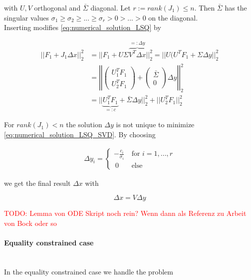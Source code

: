 \documentclass{scrartcl}[12pt, halfparskip]
\newcommand{\todo}[1]{\textcolor{red}{TODO: #1}}
\begin{document}
\begin{itemize}
	with $U, V$ orthogonal and $\bar{\Sigma}$ diagonal. Let $r := rank(J_1) \le n$. Then $\bar{\Sigma}$ has the singular values $\sigma_1 \ge \sigma_2 \ge ... \ge \sigma_r > 0 > ... > 0$ on the diagonal. \\
	Inserting modifies \eqref{eq:numerical_solution_LSQ} by
	
	\begin{align}
		|| F_1 + J_1 \Delta x ||_2^2 & = || F_1 + U \Sigma \overbrace{V^T \Delta x}^{=: \Delta y} ||_2^2 = || U ( U^T F_1 + \Sigma \Delta y ||_2^2 \label{eq:numerical_solution_LSQ_SVD} \\
		& = \left| \left| \begin{pmatrix}
		U_1^T F_1 \\
		U_2^T F_1
		\end{pmatrix} + 
		\begin{pmatrix}
		\bar{\Sigma} \\
		0
		\end{pmatrix}
		\Delta y \right| \right|_2^2 \nonumber \\
		& = || \underbrace{U_1^T F_1}_{=: c} + \bar{\Sigma} \Delta y ||_2^2 + || U_2^T F_1 ||_2^2 \nonumber
	\end{align}
	
	For $rank(J_1) < n$ the solution $\Delta y$ is not unique to minimize \eqref{eq:numerical_solution_LSQ_SVD}. By choosing
	
	\begin{align}
		\Delta y_i = 
		\begin{cases}
			- \frac{c_i}{\sigma_i} \ & \text{for } i=1,...,r \\
			\ 0 \ & \text{else}
		\end{cases}
	\end{align}
	
	we get the final result $\Delta x$ with
	
	\begin{equation}
		\Delta x = V \Delta y
	\end{equation}
	
	\todo{Lemma von ODE Skript noch rein? Wenn dann als Referenz zu Arbeit von Bock oder so}

\end{itemize}


\paragraph{Equality constrained case}\mbox{}\\
In the equality constrained case we handle the problem
\end{document}
